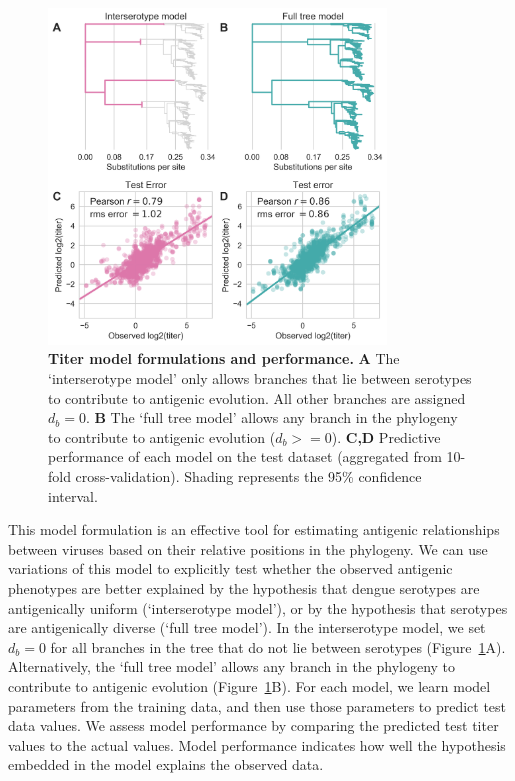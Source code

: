 \begin{figure}[h]
  \begin{centering}
    \includegraphics[width=0.8\textwidth]{./png/titer_model_performance.png}
        \caption{\textbf{Titer model formulations and performance.}
        \textbf{A} The `interserotype model' only allows branches that lie between serotypes to contribute to antigenic evolution.
        All other branches are assigned $d_b = 0$.
        \textbf{B} The `full tree model' allows any branch in the phylogeny to contribute to antigenic evolution ($d_b >= 0$).
        \textbf{C,D} Predictive performance of each model on the test dataset (aggregated from 10-fold cross-validation).
        Shading represents the 95\% confidence interval.
        }
         \label{titer_model_performance}
  \end{centering}
\end{figure}

This model formulation is an effective tool for estimating antigenic relationships between viruses based on their relative positions in the phylogeny.
We can use variations of this model to explicitly test whether the observed antigenic phenotypes are better explained by the hypothesis that dengue serotypes are antigenically uniform (`interserotype model'), or by the hypothesis that serotypes are antigenically diverse (`full tree model').
In the interserotype model, we set $d_b = 0$ for all branches in the tree that do not lie between serotypes (Figure~\ref{titer_model_performance}A).
Alternatively, the `full tree model' allows any branch in the phylogeny to contribute to antigenic evolution (Figure~\ref{titer_model_performance}B).
For each model, we learn model parameters from the training data, and then use those parameters to predict test data values.
We assess model performance by comparing the predicted test titer values to the actual values.
Model performance indicates how well the hypothesis embedded in the model explains the observed data.


